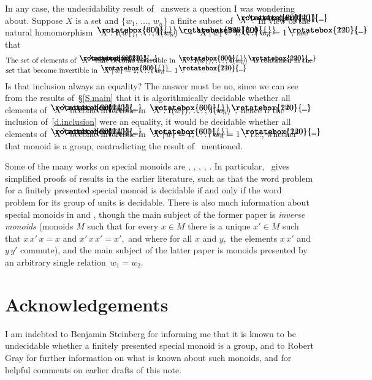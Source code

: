 \documentclass{amsart}
\numberwithin{equation}{section}
\newcommand{\I}{\mathbf{i}\hspace{.05em}}
\newcommand{\langl}{\begin{picture}(.51em,1em)
\put(.11em,.33em){\rotatebox{60}{\line(1,0){.55em}}}
\put(.11em,.33em){\rotatebox{300}{\line(1,0){.55em}}}
\end{picture}}
\newcommand{\rangl}{\begin{picture}(.5em,1em)
\put(.09em,.33em){\rotatebox{120}{\line(1,0){.55em}}}
\put(.09em,.33em){\rotatebox{240}{\line(1,0){.55em}}}
\end{picture}}
\begin{document}
In any case, the undecidability result
of~\cite{PN+CO+FO} answers a question I was wondering about.
Suppose $X$ is a set and $\{w_1,\,\dots,\,w_n\}$ a finite subset
of $\langl X\rangl.$
In view of the natural homomorphism
$\langl X:\I(w_1),\,\dots,\,\I(w_n)\rangl\to
\langl X\,|\,w_1=1,\,\dots,\,w_n=1\rangl,$ see that
%
\begin{equation}\begin{minipage}[c]{35pc}\label{d.inclusion}
%
The set of elements of $\langl X\rangl$ that become invertible
in $\langl X:\I(w_1),\,\dots,\,\I(w_n)\rangl$
is contained in the set that become invertible in
$\langl X\,|\,w_1=1,\,\dots,\,w_n=1\rangl.$
\end{minipage}\end{equation}
%
Is that inclusion always an equality?
The answer must be no, since we can see
from the results of~\S\ref{S.main} that it is algorithmically
decidable whether all elements of $\langl X\rangl$
become invertible in $\langl X:\I(w_1),\,\dots,\,\I(w_n)\rangl;$
hence if the inclusion of~\eqref{d.inclusion}
were an equality, it would be
decidable whether all elements of $\langl X\rangl$
become invertible in $\langl X\,|\,w_1=1,\,\dots,\,w_n=1\rangl,$
i.e., whether that monoid is a group,
contradicting the result of~\cite{PN+CO+FO} mentioned.

Some of the many works on special monoids are \cite{Adjan},
\cite{PN+CO+FO}, \cite{FO+LZ}, \cite{DP+PS}, \cite{LZ}.
In particular,~\cite[\S5]{LZ} gives simplified proofs of
results in the earlier literature, such as that the word problem
for a finitely presented special monoid is decidable if and only if
the word problem for its group of units is decidable.
There is also much information about special monoids
in \cite{RG+NR} and \cite{GL},
though the main subject of the former paper is {\em inverse monoids}
(monoids $M$ such that for every $x\in M$ there is a unique
$x'\in M$ such that $x\,x'\,x=x$ and $x'\,x\,x'=x',$
and where for all $x$
and $y,$ the elements $x\,x'$ and $y\,y'$ commute), and the main
subject of the latter paper is monoids presented by an
arbitrary single relation~$w_1=w_2.$

\section{Acknowledgements}\label{S.ackn}

I am indebted to Benjamin Steinberg for informing me that
it is known to be undecidable whether a finitely
presented special monoid is a group, and to Robert Gray for further
information on what is known about such monoids, and
for helpful comments on earlier drafts of this note.
\end{document}
